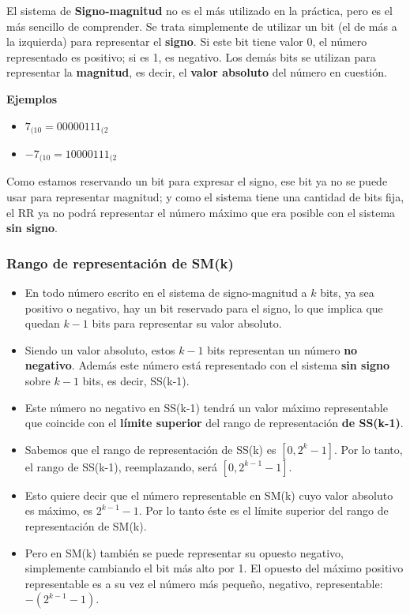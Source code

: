 \documentclass[spanish,a4paper,]{article}
\providecommand{\tightlist}{%
  \setlength{\itemsep}{0pt}\setlength{\parskip}{0pt}}
\begin{document}
El sistema de \textbf{Signo-magnitud} no es el más utilizado en la
práctica, pero es el más sencillo de comprender. Se trata simplemente de
utilizar un bit (el de más a la izquierda) para representar el
\textbf{signo}. Si este bit tiene valor 0, el número representado es
positivo; si es 1, es negativo. Los demás bits se utilizan para
representar la \textbf{magnitud}, es decir, el \textbf{valor absoluto}
del número en cuestión.

\textbf{Ejemplos}

\begin{itemize}
\tightlist
\item
  \(7_{(10} = 00000111_{(2}\)
\item
  \(-7_{(10} = 10000111_{(2}\)
\end{itemize}

Como estamos reservando un bit para expresar el signo, ese bit ya no se
puede usar para representar magnitud; y como el sistema tiene una
cantidad de bits fija, el RR ya no podrá representar el número máximo
que era posible con el sistema \textbf{sin signo}.

\hypertarget{rango-de-representaciuxf3n-de-smk}{%
\subsubsection{Rango de representación de
SM(k)}\label{rango-de-representaciuxf3n-de-smk}}

\begin{itemize}
\tightlist
\item
  En todo número escrito en el sistema de signo-magnitud a \(k\) bits,
  ya sea positivo o negativo, hay un bit reservado para el signo, lo que
  implica que quedan \(k-1\) bits para representar su valor absoluto.
\item
  Siendo un valor absoluto, estos \(k-1\) bits representan un número
  \textbf{no negativo}. Además este número está representado con el
  sistema \textbf{sin signo} sobre \(k-1\) bits, es decir, SS(k-1).
\item
  Este número no negativo en SS(k-1) tendrá un valor máximo
  representable que coincide con el \textbf{límite superior} del rango
  de representación \textbf{de SS(k-1)}.
\item
  Sabemos que el rango de representación de SS(k) es \([0, 2^k-1]\). Por
  lo tanto, el rango de SS(k-1), reemplazando, será \([0, 2^{k-1} -1]\).
\item
  Esto quiere decir que el número representable en SM(k) cuyo valor
  absoluto es máximo, es \(2^{k-1}-1\). Por lo tanto éste es el límite
  superior del rango de representación de SM(k).
\item
  Pero en SM(k) también se puede representar su opuesto negativo,
  simplemente cambiando el bit más alto por 1. El opuesto del máximo
  positivo representable es a su vez el número más pequeño, negativo,
  representable: \(-(2^{k-1}-1)\).
\end{itemize}
\end{document}

